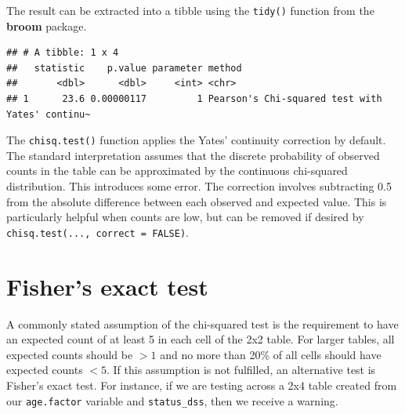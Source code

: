 \documentclass[
  12pt,
  krantz2]{krantz}
\makeatletter
\newenvironment{Shaded}{\begin{snugshade}}{\end{snugshade}}
\newcommand{\CommentTok}[1]{\textcolor[rgb]{0.56,0.35,0.01}{\textit{#1}}}
\newcommand{\KeywordTok}[1]{\textcolor[rgb]{0.13,0.29,0.53}{\textbf{#1}}}
\newcommand{\NormalTok}[1]{#1}
\newcommand{\OperatorTok}[1]{\textcolor[rgb]{0.81,0.36,0.00}{\textbf{#1}}}
\newcommand{\StringTok}[1]{\textcolor[rgb]{0.31,0.60,0.02}{#1}}
\newenvironment{kframe}{%
\medskip{}
\setlength{\fboxsep}{.8em}
 \def\at@end@of@kframe{}%
 \ifinner\ifhmode%
  \def\at@end@of@kframe{\end{minipage}}%
  \begin{minipage}{\columnwidth}%
 \fi\fi%
 \def\FrameCommand##1{\hskip\@totalleftmargin \hskip-\fboxsep
 \colorbox{shadecolor}{##1}\hskip-\fboxsep
     \hskip-\linewidth \hskip-\@totalleftmargin \hskip\columnwidth}%
 \MakeFramed {\advance\hsize-\width
   \@totalleftmargin\z@ \linewidth\hsize
   \@setminipage}}%
 {\par\unskip\endMakeFramed%
 \at@end@of@kframe}
\renewenvironment{Shaded}{\begin{kframe}}{\end{kframe}}
\makeatother
\begin{document}

The result can be extracted into a tibble using the \texttt{tidy()} function from the \textbf{broom} package.

\begin{Shaded}
\end{Shaded}

\begin{verbatim}
## # A tibble: 1 x 4
##   statistic    p.value parameter method                                         
##       <dbl>      <dbl>     <int> <chr>                                          
## 1      23.6 0.00000117         1 Pearson's Chi-squared test with Yates' continu~
\end{verbatim}

The \texttt{chisq.test()} function applies the Yates' continuity correction by default.
The standard interpretation assumes that the discrete probability of observed counts in the table can be approximated by the continuous chi-squared distribution.
This introduces some error.
The correction involves subtracting 0.5 from the absolute difference between each observed and expected value.
This is particularly helpful when counts are low, but can be removed if desired by \texttt{chisq.test(...,\ correct\ =\ FALSE)}.

\hypertarget{fishers-exact-test}{%
\section{Fisher's exact test}\label{fishers-exact-test}}

A commonly stated assumption of the chi-squared test is the requirement to have an expected count of at least 5 in each cell of the 2x2 table.
For larger tables, all expected counts should be \(>1\) and no more than 20\% of all cells should have expected counts \(<5\).
If this assumption is not fulfilled, an alternative test is Fisher's exact test.
For instance, if we are testing across a 2x4 table created from our \texttt{age.factor} variable and \texttt{status\_dss}, then we receive a warning.
\end{document}
